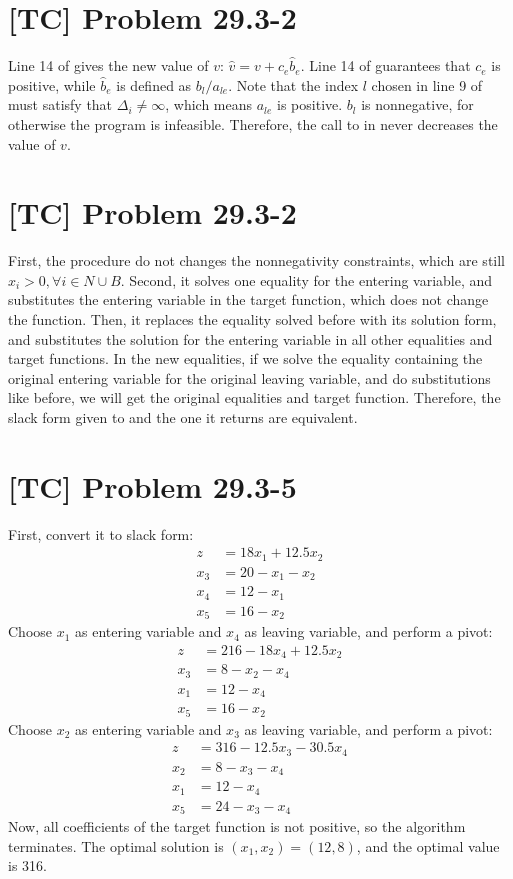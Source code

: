 \documentclass[a4paper,11pt,twocolumn]{article}
\begin{document}
  \section{[TC] Problem 29.3-2}
  Line 14 of  gives the new value of $v$: $\hat{v} = v + c_e \hat{b}_e$. Line 14 of  guarantees that $c_e$ is positive, while $\hat{b}_e$ is defined as $b_l / a_{le}$. Note that the index $l$ chosen in line 9 of  must satisfy that $\Delta_{i} \neq \infty$, which means $a_{le}$ is positive. $b_l$ is nonnegative, for otherwise the program is infeasible. Therefore, the call to  in  never decreases the value of $v$.

  \section{[TC] Problem 29.3-2}
  First, the procedure  do not changes the nonnegativity constraints, which are still $x_i > 0, \forall i \in N \cup B$. Second, it solves one equality for the entering variable, and substitutes the entering variable in the target function, which does not change the function. Then, it replaces the equality solved before with its solution form, and substitutes the solution for the entering variable in all other equalities and target functions. In the new equalities, if we solve the equality containing the original entering variable for the original leaving variable, and do substitutions like before, we will get the original equalities and target function. Therefore, the slack form given to  and the one it returns are equivalent.

  \section{[TC] Problem 29.3-5}
  First, convert it to slack form:
  \begin{align*}
    z &= 18x_1 + 12.5x_2 \\
    x_3 &= 20 - x_1 - x_2 \\
    x_4 &= 12 - x_1 \\
    x_5 &= 16 - x_2
  \end{align*}
  Choose $x_1$ as entering variable and $x_4$ as leaving variable, and perform a pivot:
  \begin{align*}
    z &= 216 - 18x_4 + 12.5x_2 \\
    x_3 &= 8 - x_2 - x_4 \\
    x_1 &= 12 - x_4 \\
    x_5 &= 16 - x_2
  \end{align*}
  Choose $x_2$ as entering variable and $x_3$ as leaving variable, and perform a pivot:
  \begin{align*}
    z &= 316 - 12.5x_3 - 30.5x_4 \\
    x_2 &= 8 - x_3 - x_4 \\
    x_1 &= 12 - x_4 \\
    x_5 &= 24 - x_3 - x_4
  \end{align*}
  Now, all coefficients of the target function is not positive, so the algorithm terminates. The optimal solution is $(x_1, x_2) = (12, 8)$, and the optimal value is 316.
\end{document}
